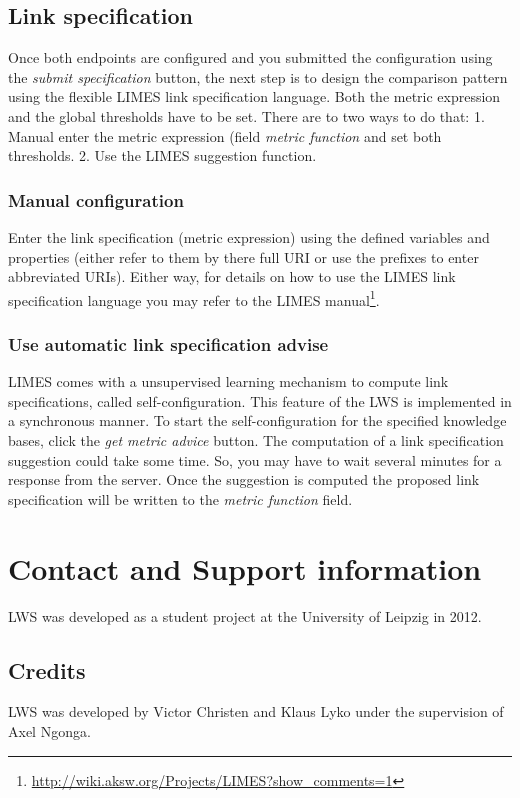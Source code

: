 \documentclass{article}
\begin{document}
\subsection{Link specification}
Once both endpoints are configured and you submitted the configuration using the \textit{submit specification}  button, the next step is to design the comparison pattern using the flexible LIMES link specification language. Both the metric expression and the global thresholds have to be set. There are to two ways to do that: 1. Manual enter the metric expression (field \textit{metric function} and set both thresholds. 2. Use the LIMES suggestion function.\\
\subsubsection{Manual configuration}
Enter the link specification (metric expression) using the defined variables and properties (either refer to them by there full URI or use the prefixes to enter abbreviated URIs). Either way, for details on how to use the LIMES link specification language you may refer to the LIMES manual\footnote{\url{http://wiki.aksw.org/Projects/LIMES?show_comments=1}}.
\subsubsection{Use automatic link specification advise}
LIMES comes with a unsupervised learning mechanism to compute link specifications, called self-configuration. This feature of the LWS is implemented in a synchronous manner. To start the self-configuration for the specified knowledge bases, click the \textit{get metric advice} button. The computation of a link specification suggestion could take some time. So, you may have to wait several minutes for a response from the server. Once the suggestion is computed the proposed link specification will be written to the \textit{metric function} field.

\section{Contact and Support information}
LWS was developed as a student project at the University of Leipzig in 2012.

\subsection{Credits}
LWS was developed by Victor Christen and Klaus Lyko under the supervision of Axel Ngonga.
\end{document}
